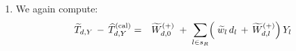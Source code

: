 \begin{enumerate}
\begin{eqnarray*}
            \overset{J}{\underset{j=1}{\sum}}\;
            \underset{k \in s_{M}^{(j)}}{\sum}\;
            \widetilde{w}_{k}\,d_{k}\,\varphi^{(j)}_{0k}
            \,\right)
        \,+\,
        \left(\;
            \underset{l \in s_{R}}{\sum}\;\widetilde{w}_{l}\,d_{l}\,Y_{l}
            \,+\,
            \underset{l \in s_{R}}{\sum}\!\left(\;
                \overset{J}{\underset{j=1}{\sum}}\;
                \underset{k \in s_{M}^{(j)}}{\sum}\,\widetilde{w}_{k}\,d_{k}\,\varphi^{(j)}_{lk}
                \right)
            Y_{l}
            \right)
    \\
    & = &
        \left(\;
            \overset{J}{\underset{j=1}{\sum}}\;
            \underset{k \in s_{M}^{(j)}}{\sum}\;
            \widetilde{w}_{k}\,d_{k}\,\varphi^{(j)}_{0k}
            \,\right)
        \,+\,
        \underset{l \in s_{R}}{\sum}
        \left(\;
            \widetilde{w}_{l}\,d_{l}
            \,+\,
            \left(\;
                \overset{J}{\underset{j=1}{\sum}}\;
                \underset{k \in s_{M}^{(j)}}{\sum}\,\widetilde{w}_{k}\,d_{k}\,\varphi^{(j)}_{lk}
                \right)
            \right)
        Y_{l}
    \\
    & \overset{{\color{white}\textnormal{\LARGE$1$}}}{=} &
        \widetilde{W}^{(+)}_{d,0}
        \;+\;
        \underset{l \in s_{R}}{\sum}\left(\,\widetilde{w}_{l}d_{l} \,+\, \widetilde{W}^{(+)}_{d,l}\,\right)Y_{l}
    \end{eqnarray*}
\item
    We again compute:
    \begin{eqnarray*}
    \widetilde{T}_{d,Y}
    \,-\,
    \widehat{T}^{\textnormal{(cal)}}_{d,Y}
    & = &
        \widetilde{W}^{(+)}_{d,0}
        \;+\;
        \underset{l \in s_{R}}{\sum}\!
        \left(\;
            \widetilde{w}_{l}\,d_{l}
            \,+\,
            \widetilde{W}^{(+)}_{d,l}
            \right)
        Y_{l}

\end{eqnarray*}
\end{enumerate}
